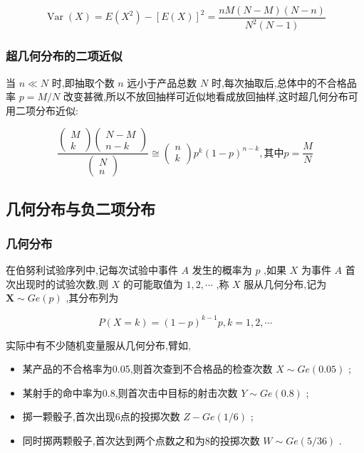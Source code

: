 \[
\operatorname{Var}(X)=E\left(X^{2}\right)-[E(X)]^{2}=\frac{n M(N-M)(N-n)}{N^{2}(N-1)}
\]

\subsubsection{超几何分布的二项近似}

当 $ n \ll N $ 时,即抽取个数 $ n $ 远小于产品总数 $ N $ 时,每次抽取后,总体中的不合格品率 $ p=M/N $ 改变甚微,所以不放回抽样可近似地看成放回抽样,这时超几何分布可用二项分布近似:

\begin{equation}
\frac{\left( 
	\begin{array}{c}
	{M} \\ 
	{k}
	\end{array}
	\right) \left( 
	\begin{array}{c}
	{N-M} \\ 
	{n-k}
	\end{array}
	\right)}{\left( 
	\begin{array}{l}
	{N} \\ 
	{n}
	\end{array}
	\right)} \cong \left( 
\begin{array}{l}
{n} \\ 
{k}
\end{array}
\right) p^{k}(1-p)^{n-k}, \text{其中} p=\frac{M}{N}  \label{eq:2.4.7}
\end{equation}

\subsection{几何分布与负二项分布}

\subsubsection{几何分布}

在伯努利试验序列中,记每次试验中事件 $ A $ 发生的概率为 $ p $ ,如果 $ X $ 为事件 $ A $ 首次出现时的试验次数,则 $ X $ 的可能取值为 $ 1,2, \cdots $ ,称 $ X $ 服从几何分布,记为 $ \boldsymbol{X} \sim G e(p) $ ,其分布列为

\begin{equation}
P(X=k)=(1-p)^{k-1} p, k=1,2, \cdots \label{eq:2.4.8}
\end{equation}

实际中有不少随机变量服从几何分布,臂如,

\begin{itemize}
	\item 某产品的不合格率为0.05,则首次查到不合格品的检查次数 $ X \sim Ge(0.05) $ ;
	\item 某射手的命中率为0.8,则首次击中目标的射击次数 $ Y\sim Ge(0.8) $ ;
	\item 掷一颗骰子,首次出现6点的投掷次数 $ Z-G e(1 / 6) $ ;
	\item 同时掷两颗骰子,首次达到两个点数之和为8的投掷次数 $ W \sim G e(5 / 36) $ .
\end{itemize}

